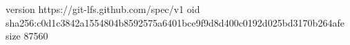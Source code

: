 version https://git-lfs.github.com/spec/v1
oid sha256:c0d1c3842a1554804b8592575a6401bce9f9d8d400c0192d025bd3170b264afe
size 87560
